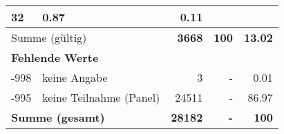 \begin{longtable}{lXrrr}
       \num{32} &
       \num[round-mode=places,round-precision=2]{0.87} &
         \num[round-mode=places,round-precision=2]{0.11} \\
     \midrule
     \multicolumn{2}{l}{Summe (gültig)} &
       \textbf{\num{3668}} &
     \textbf{\num{100}} &
       \textbf{\num[round-mode=places,round-precision=2]{13.02}} \\
     \multicolumn{5}{l}{\textbf{Fehlende Werte}}\\
       -998 &
       keine Angabe &
         \num{3} &
        - &
         \num[round-mode=places,round-precision=2]{0.01} \\
       -995 &
       keine Teilnahme (Panel) &
         \num{24511} &
        - &
         \num[round-mode=places,round-precision=2]{86.97} \\
     \midrule
     \multicolumn{2}{l}{\textbf{Summe (gesamt)}} &
          \textbf{\num{28182}} &
        \textbf{-} &
        \textbf{\num{100}} \\
     \bottomrule
     \end{longtable}
     
